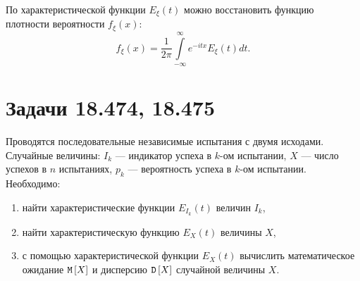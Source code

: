 По характеристической функции $E_\xi(t)$ можно восстановить функцию плотности вероятности $f_\xi(x)$:
\begin{equation}
    f_\xi(x) = \frac{1}{2 \pi} \int \limits_{-\infty}^\infty e^{-i t x} E_\xi(t) dt .
\end{equation}

\begin{comment}
    \section*{Задача 18.472}

    Случайная величина $X$ дискретного типа может принимать только два возможных значения -1 и 1, с равными вероятностями. Вычислить характеристическую функцию данного распределения.

    \subsection*{Решение:}

    По определению характеристическая функция $E_X(t)$ случайной величины $X$ имеет вид:
    \begin{multline}
        E_X(t)
        = e^{it \cdot (-1)} \probability{X = -1} + e^{it \cdot 1} \probability{X = 1}
        = e^{-it} \frac{1}{2} + e^{it} \frac{1}{2}
        = \frac{e^{-it} + e^{it}}{2} = \\
        = \frac{\cos t - i \sin t + \cos t + i \sin t}{2}
        = \frac{\cos t + \cos t}{2}
        = \cos t.
    \end{multline}

    \subsection*{Ответ:}
    $\cos t$.
\end{comment}

\section*{Задачи 18.474, 18.475}

Проводятся последовательные независимые испытания с двумя исходами. Случайные величины: $I_k$ --- индикатор успеха в $k$-ом испытании, $X$ --- число успехов в $n$ испытаниях,
$p_k$ --- вероятность успеха в $k$-ом испытании. Необходимо:
\begin{enumerate}
    \item найти характеристические функции $E_{I_k}(t)$ величин $I_k$,
    \item найти характеристическую функцию $E_X(t)$ величины $X$,
    \item с помощью характеристической функции $E_X(t)$ вычислить математическое ожидание $\mathtt{M} \left [ X \right ]$ и дисперсию $\mathtt{D} \left [ X \right ]$ случайной величины $X$.
\end{enumerate}

